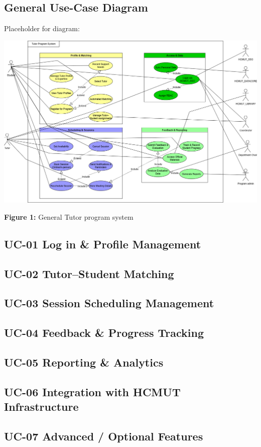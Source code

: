 \subsection{General Use-Case Diagram}
\noindent Placeholder for diagram:
\begin{center}
\includegraphics[width=0.9\linewidth]{images/usecase-general.png}
\end{center}

\begin{center}
\textbf{Figure 1:} General Tutor program system
\end{center}
\clearpage
\subsection{UC-01 Log in \& Profile Management}

\clearpage
\subsection{UC-02 Tutor--Student Matching}

\clearpage
 \subsection{UC-03 Session Scheduling Management}

\clearpage
\subsection{UC-04 Feedback \& Progress Tracking}

\clearpage
\subsection{UC-05 Reporting \& Analytics}

\clearpage
\subsection{UC-06 Integration with HCMUT Infrastructure}

\clearpage
\subsection{UC-07 Advanced / Optional Features}


\newpage


